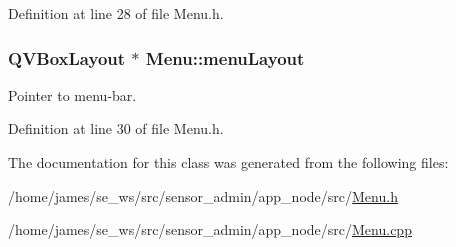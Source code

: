 Definition at line 28 of file Menu.\-h.

\hypertarget{class_menu_add3aeb0f047a98113c9bc4de13fca17f}{
\subsubsection[{menu\-Layout}]{\setlength{\rightskip}{0pt plus 5cm}Q\-V\-Box\-Layout $\ast$ Menu\-::menu\-Layout\hspace{0.3cm}{\ttfamily [private]}}}\label{class_menu_add3aeb0f047a98113c9bc4de13fca17f}
Pointer to menu-\/bar. 

Definition at line 30 of file Menu.\-h.



The documentation for this class was generated from the following files\-:\begin{DoxyCompactItemize}
\item 
/home/james/se\-\_\-ws/src/sensor\-\_\-admin/app\-\_\-node/src/\hyperlink{app__node_2src_2_menu_8h}{Menu.\-h}\item 
/home/james/se\-\_\-ws/src/sensor\-\_\-admin/app\-\_\-node/src/\hyperlink{app__node_2src_2_menu_8cpp}{Menu.\-cpp}\end{DoxyCompactItemize}
